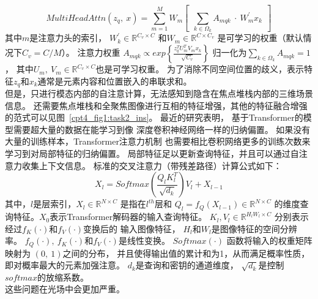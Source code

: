 % 
% 
% 
% 
\begin{equation}
	MultiHeadAttn(z_{q},~x)=\sum_{m=1}^{M}
	W_{m}\left [ ~~\sum_{k\in \Omega_{k}}^{}A_{mqk} ~\cdot~ W_{m}^{'} x_{k}  ~~\right ]  
\end{equation}
% 
% 
% 
% 
其中$m$是注意力头的索引，
$ W_{k}^{{}' } \in \mathbb{R}^{C_{v} \times C} $
和$W_{m} \in \mathbb{R}^{C\times C_{v} }$
是可学习的权重（默认情况下$C_{v}=C/M$）。
注意力权重 
$A_{mqk} \propto exp \left \{ 
\frac{
	z_{q}^{T} U_{m}^{T} V_{m} x_{k}
}{ \sqrt{C_{v}}
}  \right \} $
% 
% 
% 
归一化为$ {\textstyle \sum_{k\in\Omega_{k}}^{}} A_{mqk} = 1$，
其中$U_{m},~V_{m} \in \mathbb{R}^{C_{v}\times C}$也是可学习权重。
为了消除不同空间位置的歧义，表示特征$z_{q}$和$x_{k}$通常是元素内容和位置嵌入的串联求和。\\
%
%
%
%
\indent
但是，只进行模态内部的自注意计算，无法感知到隐含在焦点堆栈内部的三维场景信息。
还需要焦点堆栈和全聚焦图像进行互相的特征增强，其他的特征融合增强的范式可以见图~\ref{cpt4_fig1:task2_ins}。
最近的研究表明，
基于Transformer的模型需要超大量的数据在能学习到像
深度卷积神经网络一样的归纳偏置。
如果没有大量的训练样本，Transformer注意力机制
也需要相比卷积网络更多的训练次数来学习到对局部特征的归纳偏置。
局部特征足以更新查询特征，并且可以通过自注意力收集上下文信息。
标准的交叉注意力（带残差路径）计算公式如下：
%
\begin{equation}
	X_{l}=Softmax(    \frac{Q_{l}K_{l}^{T}}{\sqrt{d_{k}}} )V_{l} + X_{l-1}
\end{equation}
%
%
%
其中，$l$是层索引，$X_{l} \in \mathbb{R}^{N\times C}$
是指在$l^{th}$层和
$ Q_{l} = f_{Q} \left ( X_{l-1} \right ) \in \mathbb{R}^{N \times C} $
的维度查询特征。$X_{0}$表示Transformer解码器的输入查询特征。
$K_{l},V_{l} \in \mathbb{R}^{H_{l}W_{l} \times C}$
分别表示经过$f_{K}(\cdot) $和$ f_{V}( \cdot )$变换后的
输入图像特征，
$H_{l}$和$W_{l}$是图像特征的空间分辨率。
$f_{Q} (\cdot),~f_{K}(\cdot) $和$ f_{V}(\cdot) $是线性变换。
$ Softmax(\cdot) $ 函数将输入的权重矩阵映射为 $(0,~1)$之间的分布，
并且使得输出值的累计和为1，从而满足概率性质，即对概率最大的元素加强注意。
$d_{k}$是查询和密钥的通道维度，
$\sqrt{d_{k}}$是控制$softmax$的放缩系数。\\
\indent
这些问题在光场中会更加严重。

